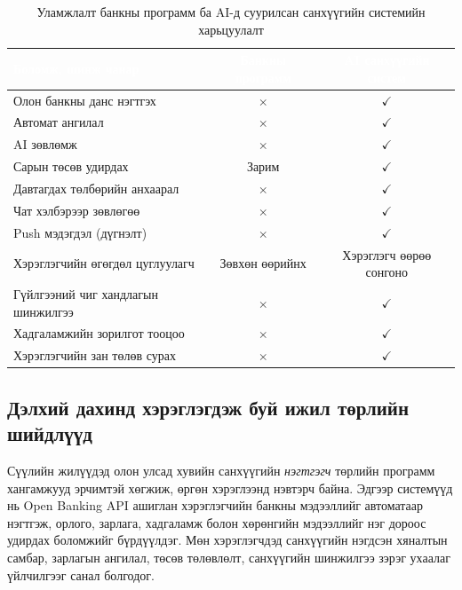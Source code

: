 \begin{table}[ht]
\centering
\footnotesize
\renewcommand{\arraystretch}{1.25}
\begin{tabular}{|p{5cm}|c|c|}
\hline
\rowcolor{darknavy}
\textcolor{white}{\textbf{Боломж, шинж чанар}} & \textcolor{white}{\textbf{Банкны программ}} & \textcolor{white}{\textbf{AI санхүүгийн систем}} \\ \hline
Олон банкны данс нэгтгэх       & $\times$    & $\checkmark$ \\ \hline
Автомат ангилал                & $\times$    & $\checkmark$ \\ \hline
AI зөвлөмж                     & $\times$    & $\checkmark$ \\ \hline
Сарын төсөв удирдах            & Зарим       & $\checkmark$ \\ \hline
Давтагдах төлбөрийн анхаарал   & $\times$    & $\checkmark$ \\ \hline
Чат хэлбэрээр зөвлөгөө         & $\times$    & $\checkmark$ \\ \hline
Push мэдэгдэл (дүгнэлт)        & $\times$    & $\checkmark$ \\ \hline
Хэрэглэгчийн өгөгдөл цуглуулагч & Зөвхөн өөрийнх & Хэрэглэгч өөрөө сонгоно \\ \hline
Гүйлгээний чиг хандлагын шинжилгээ & $\times$ & $\checkmark$ \\ \hline
Хадгаламжийн зорилгот тооцоо   & $\times$    & $\checkmark$ \\ \hline
Хэрэглэгчийн зан төлөв сурах   & $\times$    & $\checkmark$ \\ \hline
\end{tabular}
\caption{Уламжлалт банкны программ ба AI-д суурилсан санхүүгийн системийн харьцуулалт}
\label{tab:fin-app-cmp}
\end{table}

\subsection{Дэлхий дахинд хэрэглэгдэж буй ижил төрлийн шийдлүүд}
Сүүлийн жилүүдэд олон улсад хувийн санхүүгийн \emph{нэгтгэгч} төрлийн программ хангамжууд эрчимтэй хөгжиж, өргөн хэрэглээнд нэвтэрч байна. Эдгээр системүүд нь Open Banking API ашиглан хэрэглэгчийн банкны мэдээллийг автоматаар нэгтгэж, орлого, зарлага, хадгаламж болон хөрөнгийн мэдээллийг нэг дороос удирдах боломжийг бүрдүүлдэг. Мөн хэрэглэгчдэд санхүүгийн нэгдсэн хяналтын самбар, зарлагын ангилал, төсөв төлөвлөлт, санхүүгийн шинжилгээ зэрэг ухаалаг үйлчилгээг санал болгодог.\\

